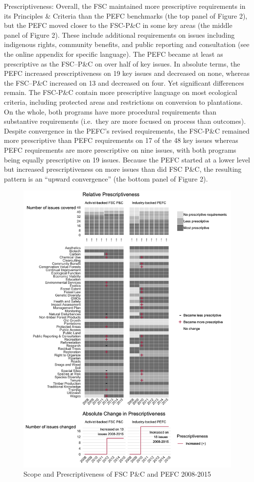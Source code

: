 \documentclass[
      12pt,
            Review ]{article}
\begin{document}
Prescriptiveness: Overall, the FSC maintained more prescriptive
requirements in its Principles \& Criteria than the PEFC benchmarks (the
top panel of Figure 2), but the PEFC moved closer to the FSC-P\&C in
some key areas (the middle panel of Figure 2). These include additional
requirements on issues including indigenous rights, community benefits,
and public reporting and consultation (see the online appendix for
specific language). The PEFC became at least as prescriptive as the
FSC--P\&C on over half of key issues. In absolute terms, the PEFC
increased prescriptiveness on 19 key issues and decreased on none,
whereas the FSC--P\&C increased on 13 and decreased on four. Yet
significant differences remain. The FSC-P\&C contain more prescriptive
language on most ecological criteria, including protected areas and
restrictions on conversion to plantations. On the whole, both programs
have more procedural requirements than substantive requirements
(i.e.~they are more focused on process than outcomes). Despite
convergence in the PEFC's revised requirements, the FSC-P\&C remained
more prescriptive than PEFC requirements on 17 of the 48 key issues
whereas PEFC requirements are more prescriptive on nine issues, with
both programs being equally prescriptive on 19 issues. Because the PEFC
started at a lower level but increased prescriptiveness on more issues
than did FSC P\&C, the resulting pattern is an ``upward convergence''
(the bottom panel of Figure 2).

\begin{figure}
\centering
\includegraphics{Figs/FSC-PEFC-1.png}
\caption{Scope and Prescriptiveness of FSC P\&C and PEFC 2008-2015}
\end{figure}
\end{document}
